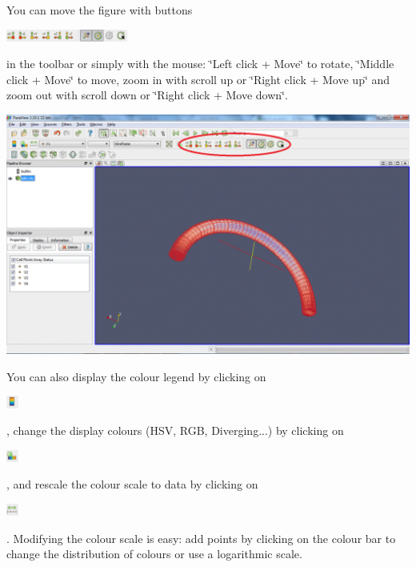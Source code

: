 You can move the figure with buttons  
\begin{DoxyImageNoCaption}
  \mbox{\includegraphics[width=0.30\textwidth]{move_button}}
\end{DoxyImageNoCaption}
 in the toolbar or simply with the mouse\+: \char`\"{}\+Left click + Move\char`\"{} to rotate, \char`\"{}\+Middle click + Move\char`\"{} to move, zoom in with scroll up or \char`\"{}\+Right click + Move up\char`\"{} and zoom out with scroll down or \char`\"{}\+Right click + Move down\char`\"{}.

 
\begin{DoxyImageNoCaption}
  \mbox{\includegraphics[width=\textwidth]{paraview04}}
\end{DoxyImageNoCaption}


You can also display the colour legend by clicking on  
\begin{DoxyImageNoCaption}
  \mbox{\includegraphics[width=0.03\textwidth]{legend_button}}
\end{DoxyImageNoCaption}
 , change the display colours (H\+SV, R\+GB, Diverging...) by clicking on  
\begin{DoxyImageNoCaption}
  \mbox{\includegraphics[width=0.03\textwidth]{color_button}}
\end{DoxyImageNoCaption}
 , and rescale the colour scale to data by clicking on  
\begin{DoxyImageNoCaption}
  \mbox{\includegraphics[width=0.03\textwidth]{scale_button}}
\end{DoxyImageNoCaption}
 . Modifying the colour scale is easy\+: add points by clicking on the colour bar to change the distribution of colours or use a logarithmic scale.


